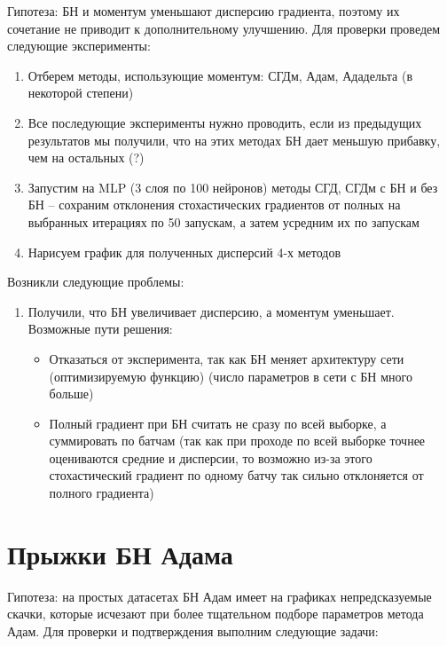\documentclass[12pt,oneside]{article}
\begin{document}
Гипотеза: БН и моментум уменьшают дисперсию градиента, поэтому их сочетание не приводит к дополнительному улучшению. Для проверки проведем следующие эксперименты:

\begin{enumerate}
\item Отберем методы, использующие моментум: СГДм, Адам, Ададельта (в некоторой степени)
\item Все последующие эксперименты нужно проводить, если из предыдущих результатов мы получили, что на этих методах БН дает меньшую прибавку, чем на остальных (?)
\item Запустим на MLP (3 слоя по 100 нейронов) методы СГД, СГДм с БН и без БН -- сохраним отклонения стохастических градиентов от полных на выбранных итерациях по 50 запускам, а затем усредним их по запускам
\item Нарисуем график для полученных дисперсий 4-х методов
\end{enumerate}

Возникли следующие проблемы:
\begin{enumerate}
\item Получили, что БН увеличивает дисперсию, а моментум уменьшает. Возможные пути решения:
\begin{itemize}
\item Отказаться от эксперимента, так как БН меняет архитектуру сети (оптимизируемую функцию) (число параметров в сети с БН много больше)
\item Полный градиент при БН считать не сразу по всей выборке, а суммировать по батчам (так как при проходе по всей выборке точнее оцениваются средние и дисперсии, то возможно из-за этого стохастический градиент по одному батчу так сильно отклоняется от полного градиента)
\end{itemize}
\end{enumerate}


\section{Прыжки БН Адама}

Гипотеза: на простых датасетах БН Адам имеет на графиках непредсказуемые скачки, которые исчезают при более тщательном подборе параметров метода Адам. Для проверки и подтверждения выполним следующие задачи:
\end{document}
